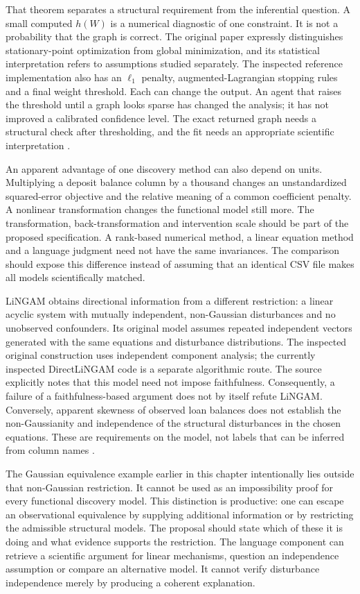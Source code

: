 That theorem separates a structural requirement from the inferential question.
A small computed $h(W)$ is a numerical diagnostic of one constraint. It is
not a probability that the graph is correct. The original paper expressly
distinguishes stationary-point optimization from global minimization, and
its statistical interpretation refers to assumptions studied separately.
The inspected reference implementation also has an $\ell_1$ penalty,
augmented-Lagrangian stopping rules and a final weight threshold. Each can
change the output. An agent that raises the threshold until a graph looks
sparse has changed the analysis; it has not improved a calibrated confidence
level. The exact returned graph needs a structural check after thresholding,
and the fit needs an appropriate scientific interpretation
\citep{notears2018,exec13_pydisc_notears}.

An apparent advantage of one discovery method can also depend on units.
Multiplying a deposit balance column by a thousand changes an unstandardized
squared-error objective and the relative meaning of a common coefficient
penalty. A nonlinear transformation changes the functional model still more.
The transformation, back-transformation and intervention scale should be
part of the proposed specification. A rank-based numerical method, a linear
equation method and a language judgment need not have the same invariances.
The comparison should expose this difference instead of assuming that an
identical CSV file makes all models scientifically matched.

LiNGAM obtains directional information from a different restriction: a linear
acyclic system with mutually independent, non-Gaussian disturbances and no
unobserved confounders. Its original model assumes repeated independent
vectors generated with the same equations and disturbance distributions.
The inspected original construction uses independent component analysis;
the currently inspected DirectLiNGAM code is a separate algorithmic route.
The source explicitly notes that this model need not impose faithfulness.
Consequently, a failure of a faithfulness-based argument does not by itself
refute LiNGAM. Conversely, apparent skewness of observed loan balances does
not establish the non-Gaussianity and independence of the structural
disturbances in the chosen equations. These are requirements on the model,
not labels that can be inferred from column names
\citep{exec13_pydisc_shimizu2006,exec13_pydisc_lingam}.

The Gaussian equivalence example earlier in this chapter intentionally lies
outside that non-Gaussian restriction. It cannot be used as an impossibility
proof for every functional discovery model. This distinction is productive:
one can escape an observational equivalence by supplying additional
information or by restricting the admissible structural models. The proposal
should state which of these it is doing and what evidence supports the
restriction. The language component can retrieve a scientific argument for
linear mechanisms, question an independence assumption or compare an
alternative model. It cannot verify disturbance independence merely by
producing a coherent explanation.

